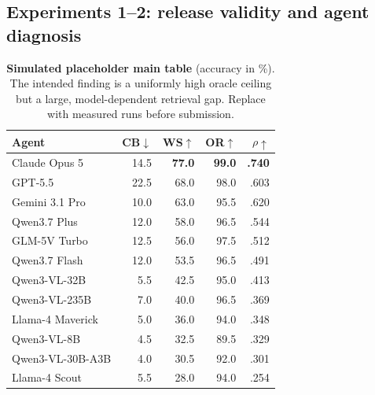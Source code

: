 \documentclass{article}
\newcommand{\placeholder}[1]{\textcolor{blue!65!black}{#1}}
\begin{document}
\subsection{Experiments 1--2: release validity and agent diagnosis}
\begin{table}[t]
\centering
\small
\setlength{\tabcolsep}{5pt}
\begin{tabular}{lrrrr}
\toprule
Agent & CB$\downarrow$ & WS$\uparrow$ & OR$\uparrow$ & $\rho\uparrow$\\
\midrule
Claude Opus 5 & \placeholder{14.5} & \placeholder{\textbf{77.0}} &
\placeholder{\textbf{99.0}} & \placeholder{\textbf{.740}}\\
GPT-5.5 & \placeholder{22.5} & \placeholder{68.0} &
\placeholder{98.0} & \placeholder{.603}\\
Gemini 3.1 Pro & \placeholder{10.0} & \placeholder{63.0} &
\placeholder{95.5} & \placeholder{.620}\\
Qwen3.7 Plus & \placeholder{12.0} & \placeholder{58.0} &
\placeholder{96.5} & \placeholder{.544}\\
GLM-5V Turbo & \placeholder{12.5} & \placeholder{56.0} &
\placeholder{97.5} & \placeholder{.512}\\
Qwen3.7 Flash & \placeholder{12.0} & \placeholder{53.5} &
\placeholder{96.5} & \placeholder{.491}\\
Qwen3-VL-32B & \placeholder{5.5} & \placeholder{42.5} &
\placeholder{95.0} & \placeholder{.413}\\
Qwen3-VL-235B & \placeholder{7.0} & \placeholder{40.0} &
\placeholder{96.5} & \placeholder{.369}\\
Llama-4 Maverick & \placeholder{5.0} & \placeholder{36.0} &
\placeholder{94.0} & \placeholder{.348}\\
Qwen3-VL-8B & \placeholder{4.5} & \placeholder{32.5} &
\placeholder{89.5} & \placeholder{.329}\\
Qwen3-VL-30B-A3B & \placeholder{4.0} & \placeholder{30.5} &
\placeholder{92.0} & \placeholder{.301}\\
Llama-4 Scout & \placeholder{5.5} & \placeholder{28.0} &
\placeholder{94.0} & \placeholder{.254}\\
\bottomrule
\end{tabular}
\caption{\textbf{Simulated placeholder main table} (accuracy in \%).
The intended finding is a uniformly high oracle ceiling but a large,
model-dependent retrieval gap. Replace with measured runs before submission.}
\label{tab:main}
\end{table}
\end{document}
